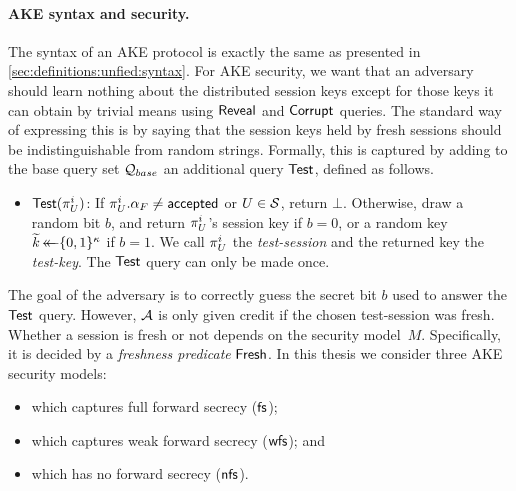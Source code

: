 \paragraph{AKE syntax and security.}
The syntax of an AKE protocol is exactly the same as presented in \cref{sec:definitions:unfied:syntax}.
For AKE security,
we want that an adversary should learn nothing about the distributed session keys except for those keys it can obtain by trivial means using $\mathsf{Reveal}$ and $\mathsf{Corrupt}$ queries.
The standard way of expressing this is by saying that the session keys held by fresh sessions should be indistinguishable from random strings.  
Formally,
this is captured by adding to the base query set $\mathcal{Q}_{base}$ an additional query $\mathsf{Test}$,
defined as follows.

\begin{itemize}
	\item $\Test(\oracle[U][i])$: 
	If $\oracle[U][i].\runstate_F \neq \accepted$ or $U \in \mathcal{S}$, return $\bot$.
	Otherwise,
	draw a random bit $b$,
	and	return $\oracle[U][i]$'s session key if $b = 0$, 
	or a random key $\widetilde{k} \operatorname{\leftarrow\mathrel{\mkern-14mu}\leftarrow} \lbrace 0, 1 \rbrace^\kappa$ if $b = 1$.
	We call $\oracle[U][i]$ the \emph{test-session} and the returned key the \emph{test-key}.
	The $\mathsf{Test}$ query can only be made once.
\end{itemize}





The goal of the adversary is to correctly guess the secret bit $b$ used to answer the $\mathsf{Test}$ query.
However,
$\mathcal{A}$ is only given credit if the chosen test-session was fresh.
Whether a session is fresh or not depends on the security model~$M$.
Specifically,
it is decided by a \emph{freshness predicate} $\mathsf{Fresh}$.
In this thesis we consider three AKE security models:
\begin{itemize}
	\item \akefstext which captures full forward secrecy ($\mathsf{fs}$);
	
	\item \akewfstext  which captures weak forward secrecy ($\mathsf{wfs}$); and
		
	\item \akenfstext which has no forward secrecy ($\mathsf{nfs}$).
\end{itemize}

